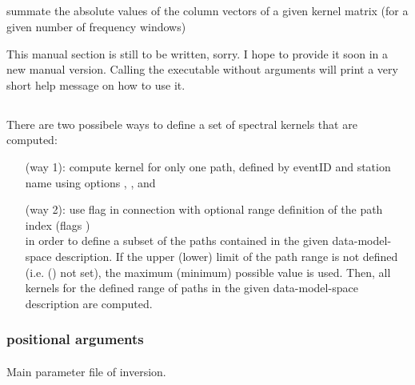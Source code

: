 \subsection{} \label{programs_scripts,sec:bin_prog,sec:compute_kernel_coverage}
summate the absolute values of the column vectors of a given kernel matrix (for a given number of 
frequency windows)

This manual section is still to be written, sorry. I hope to provide it soon in a new manual version. %
Calling the executable without arguments will print a very short help message on how to use it.
%
%
\subsection{} \label{programs_scripts,sec:bin_prog,sec:com_kernel}
There are two possibele ways to define a set of spectral kernels that are computed:
\begin{itemize}
\item[(way 1):] compute kernel for only one path, defined by eventID and station name using options , ,  and 
\item[(way 2):] use flag  in connection with optional range definition of the path index (flags  )\\
in order to define a subset of the paths contained in the given data-model-space description. If the upper (lower) limit of the path range is not defined (i.e.  () not set), the maximum (minimum) possible value is used. Then, all kernels for the defined range of paths in the given data-model-space description are computed.
\end{itemize}
\subsubsection{positional arguments}
\paragraph{}
Main parameter file of inversion.

